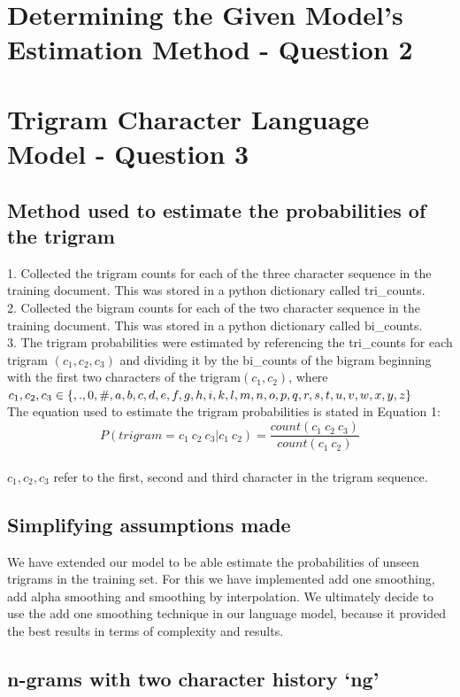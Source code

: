 \documentclass[12pt]{article}
\begin{document}
\section{Determining the Given Model's Estimation Method - Question 2} 
\section{Trigram Character Language Model - Question 3}
\subsection{Method used to estimate the probabilities of the trigram}
1. Collected the trigram counts for each of the three character sequence in the training document. This was stored in a python dictionary called tri\_counts.\\
2. Collected the bigram counts for each of the two character sequence in the training document. This was stored in a python dictionary called bi\_counts.\\
3. The trigram probabilities were estimated by referencing the tri\_counts for each trigram $(c_1,c_2,c_3)$ and dividing it by the bi\_counts of the bigram beginning with the first two characters of the trigram$(c_1,c_2)$, where $c_1,c_2,c_3 \in \{ ,.,0,\#,a,b,c,d,e,f,g,h,i,k,l,m,n,o,p,q,\\r,s,t,u,v,w,x,y,z\}$\\
The equation used to estimate the trigram probabilities is stated in Equation 1:
\begin{equation}
P(trigram = c_{1}\ c_{2}\ c_{3}|c_{1}\ c_{2})= \dfrac{count(c_{1}\ c_{2}\ c_{3})}{count(c_1\ c_2)} 
\end{equation}\\
$c_1,c_2,c_3$  refer to the first, second and third character in the trigram sequence.\\
\subsection{Simplifying assumptions made}
We have extended our model to be able estimate the probabilities of unseen trigrams in the training set. For this we have implemented add one smoothing, add alpha smoothing and smoothing by interpolation. We ultimately decide to use the add one smoothing technique in our language model, because it provided the best results in terms of complexity and results.

\subsection{n-grams with two character history `ng'}
\end{document}
